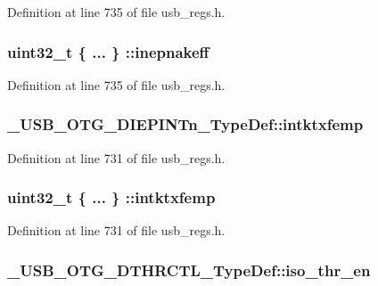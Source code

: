 Definition at line 735 of file usb\-\_\-regs.\-h.

\hypertarget{group___u_s_b___o_t_g___d_r_i_v_e_r_ga99981ce29484a4f6547f573138a04152}{
\subsubsection[{inepnakeff}]{\setlength{\rightskip}{0pt plus 5cm}uint32\-\_\-t \{ ... \} \-::inepnakeff}}\label{group___u_s_b___o_t_g___d_r_i_v_e_r_ga99981ce29484a4f6547f573138a04152}


Definition at line 735 of file usb\-\_\-regs.\-h.

\hypertarget{group___u_s_b___o_t_g___d_r_i_v_e_r_gace8bd424f49bb9281260714fc42c035b}{
\subsubsection[{intktxfemp}]{ \-\_\-\-U\-S\-B\-\_\-\-O\-T\-G\-\_\-\-D\-I\-E\-P\-I\-N\-Tn\-\_\-\-Type\-Def\-::intktxfemp}}\label{group___u_s_b___o_t_g___d_r_i_v_e_r_gace8bd424f49bb9281260714fc42c035b}


Definition at line 731 of file usb\-\_\-regs.\-h.

\hypertarget{group___u_s_b___o_t_g___d_r_i_v_e_r_ga727a810fced413de67a00493c23c3a7b}{
\subsubsection[{intktxfemp}]{\setlength{\rightskip}{0pt plus 5cm}uint32\-\_\-t \{ ... \} \-::intktxfemp}}\label{group___u_s_b___o_t_g___d_r_i_v_e_r_ga727a810fced413de67a00493c23c3a7b}


Definition at line 731 of file usb\-\_\-regs.\-h.

\hypertarget{group___u_s_b___o_t_g___d_r_i_v_e_r_ga061c382bbfc6cb270dd9074511b6546b}{
\subsubsection[{iso\-\_\-thr\-\_\-en}]{ \-\_\-\-U\-S\-B\-\_\-\-O\-T\-G\-\_\-\-D\-T\-H\-R\-C\-T\-L\-\_\-\-Type\-Def\-::iso\-\_\-thr\-\_\-en}}\label{group___u_s_b___o_t_g___d_r_i_v_e_r_ga061c382bbfc6cb270dd9074511b6546b}


